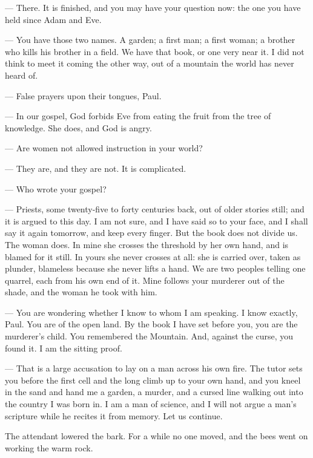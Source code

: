 \begin{room}

--- There. It is finished, and you may have your question now: the one you have held since Adam and Eve.

--- You have those two names. A garden; a first man; a first woman; a brother who kills his brother in a field. We have that book, or one very near it. I did not think to meet it coming the other way, out of a mountain the world has never heard of.

--- False prayers upon their tongues, Paul.

--- In our gospel, God forbids Eve from eating the fruit from the tree of knowledge. She does, and God is angry.

--- Are women not allowed instruction in your world?

--- They are, and they are not. It is complicated.

--- Who wrote your gospel?

--- Priests, some twenty-five to forty centuries back, out of older stories still; and it is argued to this day. I am not sure, and I have said so to your face, and I shall say it again tomorrow, and keep every finger. But the book does not divide us. The woman does. In mine she crosses the threshold by her own hand, and is blamed for it still. In yours she never crosses at all: she is carried over, taken as plunder, blameless because she never lifts a hand. We are two peoples telling one quarrel, each from his own end of it. Mine follows your murderer out of the shade, and the woman he took with him.

--- You are wondering whether I know to whom I am speaking. I know exactly, Paul. You are of the open land. By the book I have set before you, you are the murderer's child. You remembered the Mountain. And, against the curse, you found it. I am the sitting proof.

--- That is a large accusation to lay on a man across his own fire. The tutor sets you before the first cell and the long climb up to your own hand, and you kneel in the sand and hand me a garden, a murder, and a cursed line walking out into the country I was born in. I am a man of science, and I will not argue a man's scripture while he recites it from memory. Let us continue.

\end{room}

The attendant lowered the bark. For a while no one moved, and the bees went on working the warm rock.


